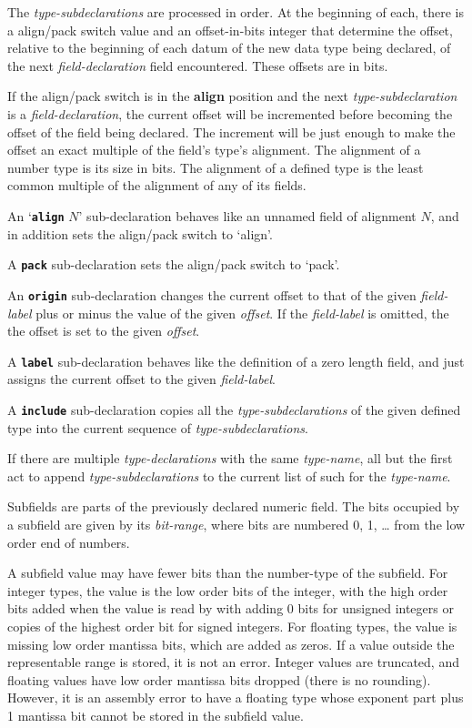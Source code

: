 \documentclass[12pt]{article}
\newcommand{\key}[1]{{\rm \bfseries #1}}
\newcommand{\ttkey}[1]{{\tt \bfseries #1}}
\begin{document}
The {\em type-subdeclarations} are processed in order.  At the
beginning of each, there is a align/pack switch value and an
offset-in-bits integer that determine the offset, relative to the
beginning of each datum of the new data type being declared, of the next
{\em field-declaration} field encountered.  These offsets are in bits.

If the align/pack switch is in the \key{align} position and the
next {\em type-subdeclaration} is a {\em field-declaration}, the
current offset will be incremented before becoming the offset
of the field being declared.  The increment will be just enough
to make the offset an exact multiple of the field's type's alignment.
The alignment of a number type is its size in bits.  The alignment
of a defined type is the least common multiple of the alignment of
any of its fields.

An `\ttkey{align} $N$' sub-declaration behaves like an unnamed
field of alignment $N$, and in addition sets the align/pack switch
to `align'.

A \ttkey{pack} sub-declaration sets the align/pack switch to `pack'.

An \ttkey{origin} sub-declaration changes the current offset to that
of the given {\em field-label} plus or minus the value of the
given {\em offset}.  If the {\em field-label} is omitted, the
the offset is set to the given {\em offset}.

A \ttkey{label} sub-declaration behaves like the definition of a
zero length field, and just assigns the current offset to the
given {\em field-label}.

A \ttkey{include} sub-declaration copies all the {\em type-subdeclarations}
of the given defined type into the current sequence of
{\em type-subdeclarations}.

If there are multiple {\em type-declarations} with the same
{\em type-name}, all but the first act to append {\em type-subdeclarations}
to the current list of such for the {\em type-name}.

Subfields are parts of the previously declared numeric field.
The bits occupied
by a subfield are given by its {\em bit-range}, where bits are numbered
0, 1, \ldots{} from the low order end of numbers.

A subfield value may have fewer bits than the number-type of the subfield.
For integer types, the value is the low order bits of the integer, with
the high order bits added when the value is read by with adding 0 bits
for unsigned integers or copies of the highest order bit for signed integers.
For floating types, the value is missing low order mantissa bits, which
are added as zeros.  If a value outside the representable range is stored,
it is not an error.  Integer values are truncated, and floating values
have low order mantissa bits dropped (there is no rounding).  However, it is
an assembly error to have a floating type whose exponent part plus
1 mantissa bit cannot be stored in the subfield value.
\end{document}
